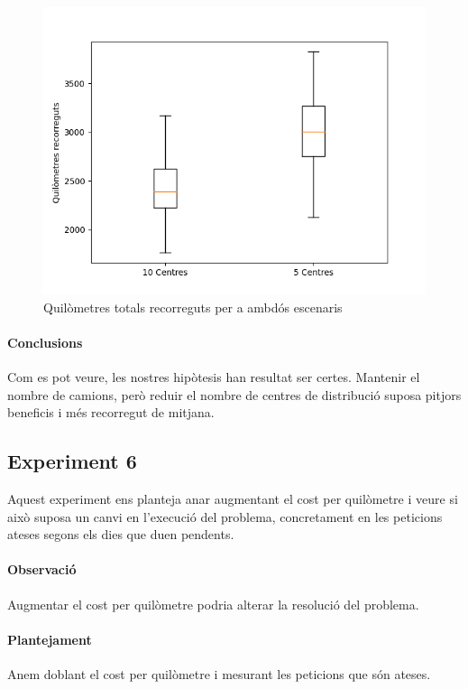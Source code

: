 \documentclass[a4paper]{article}
\begin{document}
\begin{figure}[htp]
\centering
\includegraphics[scale=0.65]{images/experiment-5-1.png}
\caption{Quilòmetres totals recorreguts per a ambdós escenaris}
\centering
\end{figure}

\newpage
\paragraph{Conclusions} Com es pot veure, les nostres hipòtesis han resultat ser certes. Mantenir el nombre de camions, però reduir el nombre de centres de distribució suposa pitjors beneficis i més recorregut de mitjana.

\newpage

\subsection{Experiment 6}
Aquest experiment ens planteja anar augmentant el cost per quilòmetre i veure si això suposa un canvi en l'execució del problema, concretament en les peticions ateses segons els dies que duen pendents.
\paragraph{Observació} Augmentar el cost per quilòmetre podria alterar la resolució del problema.
\paragraph{Plantejament} Anem doblant el cost per quilòmetre i mesurant les peticions que són ateses.
\end{document}
